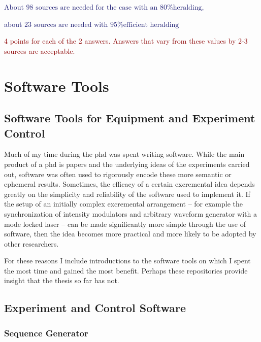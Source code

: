 \documentclass[11pt]{caltech_thesis} %
\begin{document}
\begin{enumerate}
  \textcolor{midnightblue}{About $\boxed{\text{98 sources are needed for the case with an 80\% heralding}}$, }

  \textcolor{midnightblue}{about $\boxed{\text{23 sources are needed with 95\% efficient heralding}}$}

  \textcolor{darkred}{ 4 points for each of the 2 answers. Answers that vary from these values by 2-3 sources are acceptable. }
\end{enumerate}

\hypertarget{software-tools}{%
\chapter{Software Tools}\label{software-tools}}

\hypertarget{software-tools-for-equipment-and-experiment-control}{%
\section{Software Tools for Equipment and Experiment Control}\label{software-tools-for-equipment-and-experiment-control}}

Much of my time during the phd was spent writing software. While the main product of a phd is papers and the underlying ideas of the experiments carried out, software was often used to rigorously encode these more semantic or ephemeral results. Sometimes, the efficacy of a certain excremental idea depends greatly on the simplicity and reliability of the software used to implement it. If the setup of an initially complex excremental arrangement -- for example the synchronization of intensity modulators and arbitrary waveform generator with a mode locked laser -- can be made significantly more simple through the use of software, then the idea becomes more practical and more likely to be adopted by other researchers.

For these reasons I include introductions to the software tools on which I spent the most time and gained the most benefit. Perhaps these repositories provide insight that the thesis so far has not.

\hypertarget{experiment-and-control-software}{%
\section{Experiment and Control Software}\label{experiment-and-control-software}}

\hypertarget{sequence-generator}{%
\subsection{Sequence Generator}\label{sequence-generator}}
\end{document}
